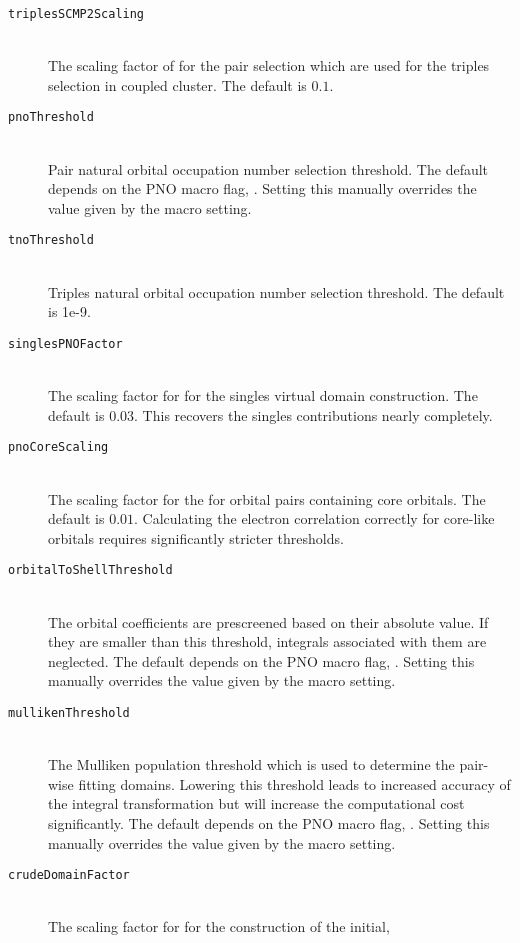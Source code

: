 \begin{description}
    \item [\texttt{triplesSCMP2Scaling}]\hfill \\
    The scaling factor of  for the pair selection which are used for the triples
    selection in coupled cluster. The default is $0.1$.
    \item [\texttt{pnoThreshold}]\hfill \\
    Pair natural orbital occupation number selection threshold. The default depends on the PNO macro flag,
    . Setting this manually overrides the value given by the macro setting.
    \item [\texttt{tnoThreshold}]\hfill \\
    Triples natural orbital occupation number selection threshold. The default is 1e-9.
    \item [\texttt{singlesPNOFactor}]\hfill \\
    The scaling factor for  for the singles virtual domain construction. The default
    is $0.03$. This recovers the singles contributions nearly completely.
    \item [\texttt{pnoCoreScaling}]\hfill \\
    The scaling factor for the  for orbital pairs containing core orbitals. The
    default is $0.01$. Calculating the electron correlation correctly for core-like orbitals requires
    significantly stricter thresholds.
    \item [\texttt{orbitalToShellThreshold}]\hfill \\
    The orbital coefficients are prescreened based on their absolute value. If they are smaller than this
    threshold, integrals associated with them are neglected. The default depends on the PNO macro flag,
    . Setting this manually overrides the value given by the macro setting.
    \item [\texttt{mullikenThreshold}]\hfill \\
    The Mulliken population threshold which is used to determine the pair-wise fitting domains. Lowering this
    threshold leads to increased accuracy of the integral transformation but will increase the computational
    cost significantly. The default depends on the PNO macro flag,
    . Setting this manually overrides the value given by the macro setting.
    \item [\texttt{crudeDomainFactor}]\hfill \\
    The scaling factor for  for the construction of the initial,

\end{description}
